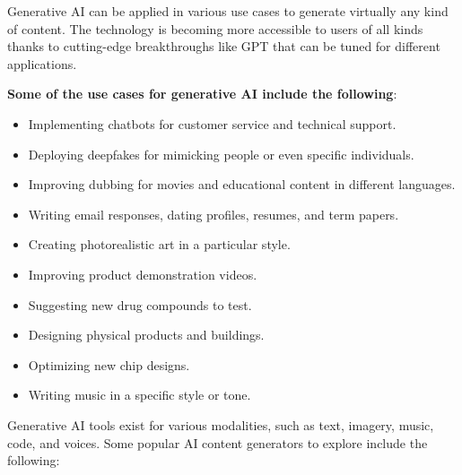 \documentclass[12pt]{report}
\theoremstyle{largebreak}
\begin{document}
    Generative AI can be applied in various use cases to generate virtually any kind of content. The technology is becoming more accessible to users of all kinds thanks to cutting-edge breakthroughs like GPT that can be tuned for different applications. 

    \textbf{Some of the use cases for generative AI include the following}:

    \begin{itemize}
        \item Implementing chatbots for customer service and technical support.
        
        \item Deploying deepfakes for mimicking people or even specific individuals.
        
        \item Improving dubbing for movies and educational content in different languages.
        
        \item Writing email responses, dating profiles, resumes, and term papers.
        
        \item Creating photorealistic art in a particular style.
        
        \item Improving product demonstration videos.
        
        \item Suggesting new drug compounds to test.
        
        \item Designing physical products and buildings.
        
        \item Optimizing new chip designs.
        
        \item Writing music in a specific style or tone.
    \end{itemize}

    Generative AI tools exist for various modalities, such as text, imagery, music, code, and voices. Some popular AI content generators to explore include the following:
\end{document}

